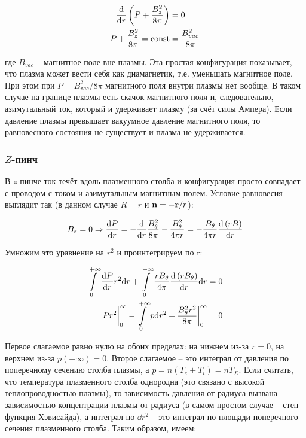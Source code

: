 \documentclass[10pt, a4paper]{article}
\begin{document}
\begin{align*}
	\dv{}{r}\left( P + \frac{B_z^2}{8\pi} \right) &= 0 \\
	P + \frac{B_z^2}{8\pi} = \text{const} &= \frac{B_{vac}^2}{8\pi}
\end{align*}

где $B_{vac}$ -- магнитное поле вне плазмы. Эта простая конфигурация показывает, что плазма может вести себя как диамагнетик, т.е. уменьшать магнитное поле. При этом при $P = B_{vac}^2/8\pi$ магнитного поля внутри плазмы нет вообще. В таком случае на границе плазмы есть скачок магнитного поля и, следовательно, азимутальный ток, который и удерживает плазму (за счёт силы Ампера). Если давление плазмы превышает вакуумное давление магнитного поля, то равновесного состояния не существует и плазма не удерживается.

\subsubsection{$Z$-пинч}

В $z$-пинче ток течёт вдоль плазменного столба и конфигурация просто совпадает с проводом с током и азимутальным магнитным полем. Условие равновесия выглядит так (в данном случае $R=r$ и $\vb{n}=-\vb{r}/r$):

\begin{equation*}
	B_z = 0 \Rightarrow \dv{P}{r} = -\dv{}{r}\frac{B_\theta^2}{8\pi} - \frac{B_\theta^2}{4\pi r} = -\frac{B_\theta}{4\pi r}\dv{\left( rB \right)}{r}
\end{equation*}

Умножим это уравнение на $r^2$ и проинтегрируем по r:

\begin{align*}
	\int\limits_0^{+\infty}\dv{P}{r}r^2\dd r + \int\limits_0^{+\infty}\frac{rB_\theta}{4\pi}\dv{\left( rB_\theta \right)}{r}\dd r &= 0 \\
	Pr^2\bigg|_0^{\infty} - \int\limits_0^{+\infty}p\dd r^2 + \frac{B_\theta^2 r^2}{8\pi}\bigg|_0^{\infty} &= 0
\end{align*}

Первое слагаемое равно нулю на обоих пределах: на нижнем из-за $r=0$, на верхнем из-за $p(+\infty)=0$. Второе слагаемое -- это интеграл от давления по поперечному сечению столба плазмы, а $p=n(T_e+T_i)=nT_\Sigma$. Если считать, что температура плазменного столба однородна (это связано с высокой теплопроводностью плазмы), то зависимость давления от радиуса вызвана зависимостью концентрации плазмы от радиуса (в самом простом случае -- степ-функция Хэвисайда), а интеграл по $\dd r^2$ -- это интеграл по площади поперечного сечения плазменного столба. Таким образом, имеем:
\end{document}
